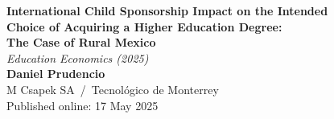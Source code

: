 \documentclass[aspectratio=169, 10pt]{beamer}
\begin{document}
\begin{frame}[plain]
  \vspace{1.5em}
  \begin{center}
    {\color{navyblue}\Large\bfseries
      International Child Sponsorship Impact on the Intended\\[0.3em]
      Choice of Acquiring a Higher Education Degree:\\[0.3em]
      The Case of Rural Mexico}\\[1em]
    {\color{institutgold}\large\itshape Education Economics (2025)}\\[1.5em]
    {\color{navyblue}\normalsize\bfseries Daniel Prudencio}\\[0.3em]
    {\color{medgray}\small M Csapek SA \,/\, Tecnológico de Monterrey}\\[1.5em]
    {\color{institutgold}\small Published online: 17 May 2025}
  \end{center}
\end{frame}
\end{document}
